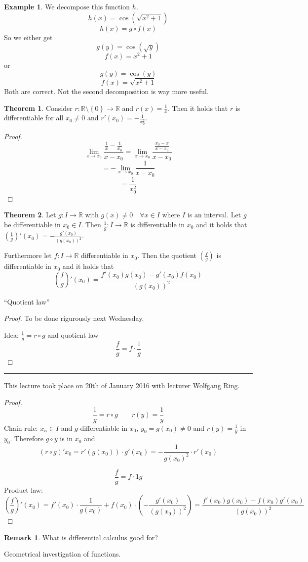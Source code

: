 \documentclass[a4paper,landscape,twocolumn]{article}
\theoremstyle{definition}
\newtheorem{theorem}{Theorem}
\newtheorem{rem}{Remark}
\newtheorem{ex}{Example}
\newcommand\set[1]{\left\{#1\right\}}
\newcommand\meta[3]{\hrule{} This #1 took place on #2 with lecturer #3.\par}
\begin{document}
\begin{ex}
  We decompose this function $h$.
  \[ h(x) = \cos(\sqrt{x^2 + 1}) \]
  \[ h(x) = g \circ f(x) \]
  So we either get
  \[ g(y) = \cos(\sqrt{y}) \]
  \[ f(x) = x^2 + 1 \]
  or
  \[ g(y) = \cos(y) \]
  \[ f(x) = \sqrt{x^2 + 1} \]
  Both are correct. Not the second decomposition is way more useful.
\end{ex}

\begin{theorem}
  Consider $r: \mathbb R \setminus \set{0} \to \mathbb R$
  and $r(x) = \frac1x$. Then it holds that $r$ is differentiable
  for all $x_0 \neq 0$ and $r'(x_0) = -\frac1{x_0^2}$.
\end{theorem}
\begin{proof}
  \[ \lim_{x \to x_0} \frac{\frac1x - \frac1{x_0}}{x - x_0} = \lim_{x \to x_0} \frac{\frac{x_0 - x}{x - x_0}}{x - x_0} \]
  \[ = -\lim_{x \to x_0} \frac1{x - x_0} \]
  \[ = \frac1{x_0^2} \]
\end{proof}

\begin{theorem}
  Let $g: I \to \mathbb R$ with $g(x) \neq 0 \quad\forall x \in I$ where $I$ is an interval.
  Let $g$ be differentiable in $x_0 \in I$. Then $\frac1{g}: I \to \mathbb R$ is differentiable in $x_0$
  and it holds that $\left(\frac1{g}\right)'(x_0) = -\frac{g'(x_0)}{(g(x_0))^2}$.

  Furthermore let $f: I \to \mathbb R$ differentiable in $x_0$. Then the quotient
  $\left(\frac{f}{g}\right)$ is differentiable in $x_0$ and it holds that
  \[
    \left(\frac{f}{g}\right)'(x_0) = \frac{f'(x_0) g(x_0) - g'(x_0) f(x_0)}{(g(x_0))^2}
  \]
  \begin{center}
    \enquote{Quotient law}
  \end{center}
\end{theorem}
\begin{proof}
  To be done rigurously next Wednesday.

  Idea: $\frac1{g} = r \circ g$ and quotient law
  \[ \frac fg = f \cdot \frac1g \]
\end{proof}

\meta{lecture}{20th of January 2016}{Wolfgang Ring}

\begin{proof}
  \[ \frac1g = r \circ g \qquad r(y) = \frac1y \]
  Chain rule: $x_n \in I$ and $g$ differentiable in $x_0$,
  $y_0 = g(x_0) \neq 0$ and $r(y) = \frac1y$ in $y_0$.
  Therefore $g\circ y$ is in $x_0$ and
  \[
    (r \circ g)' x_0 = r'(g(x_0)) \cdot g'(x_0)
    = -\frac1{{g(x_0)}^2} \cdot r'(x_0)
  \]

  \[ \frac fg = f \cdot 1g \]
  Product law:
  \[
    \left(\frac fg\right)'(x_0) = f'(x_0) \cdot \frac1{g(x_0)} +
    f(x_0) \cdot \left(-\frac{g'(x_0)}{(g(x_0))^2}\right)
    = \frac{f'(x_0) g(x_0) - f(x_0) g'(x_0)}{(g(x_0))^2}
  \]
\end{proof}
\begin{rem}
  What is differential calculus good for?

  Geometrical investigation of functions.
\end{rem}
\end{document}
